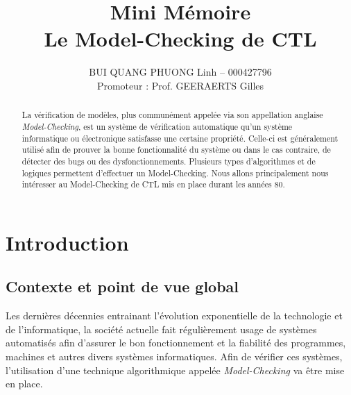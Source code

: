 \documentclass[runningheads,a4paper,10pt]{llncs}
\begin{document}
\mainmatter 

\title{Mini Mémoire \\ Le Model-Checking de CTL}


\author{BUI QUANG PHUONG Linh -- 000427796 \\ Promoteur : Prof. GEERAERTS Gilles}



\tocauthor{{}}

\maketitle


\begin{abstract}
La vérification de modèles, plus communément appelée via son appellation anglaise \textit{Model-Checking}, est un système de vérification automatique qu'un système informatique ou électronique satisfasse une certaine propriété. Celle-ci est généralement utilisé afin de prouver la bonne fonctionnalité du système ou dans le cas contraire, de détecter des bugs ou des dysfonctionnements. Plusieurs types d'algorithmes et de logiques permettent d'effectuer un Model-Checking. Nous allons principalement nous intéresser au Model-Checking de CTL mis en place durant les années 80. 
\end{abstract}

\medskip

\begingroup
\let\clearpage\relax
\tableofcontents
\endgroup

\medskip
\medskip

\newpage 

\section{Introduction}

\subsection{Contexte et point de vue global}
\noindent
Les dernières décennies entrainant l'évolution exponentielle de la technologie et de l'informatique, la société actuelle fait régulièrement usage de systèmes automatisés afin d'assurer le bon fonctionnement et la fiabilité des programmes, machines et autres divers systèmes informatiques. Afin de vérifier ces systèmes, l'utilisation d'une technique algorithmique appelée \textit{Model-Checking} va être mise en place.  
\end{document}
